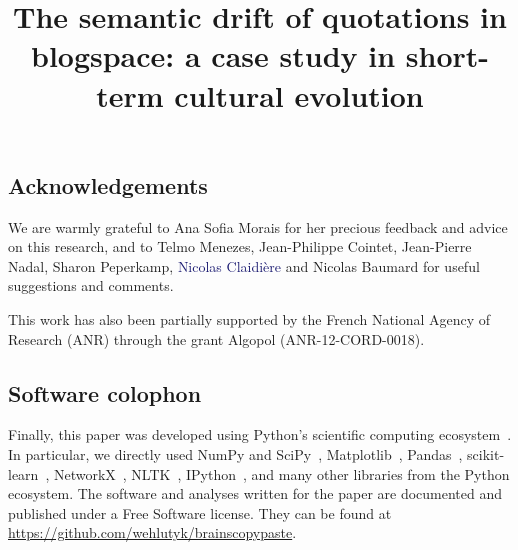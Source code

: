 \documentclass[man]{apa6}
\title{The semantic drift of quotations in blogspace: a case study in short-term cultural evolution}
\date{}
\newcommand{\tg}[1]{\textcolor{MidnightBlue}{#1}}
\newcommand{\newtext}[1]{\tg{#1}}
\newenvironment{new}{\par\color{MidnightBlue}}{\par}
\begin{document}
\maketitle







\subsection*{Acknowledgements}

We are warmly grateful to Ana Sofia Morais for her precious feedback and advice on this research, and to Telmo Menezes, Jean-Philippe Cointet, Jean-Pierre Nadal, Sharon Peperkamp, \newtext{Nicolas Claidière} and Nicolas Baumard for useful suggestions and comments.

{\new This work has also been partially supported by the French National Agency of Research (ANR) through the grant Algopol (ANR-12-CORD-0018).}

\begin{new}

\subsection*{Software colophon}

Finally, this paper was developed using Python's scientific computing ecosystem~\citep{millman_python_2011}.
In particular, we directly used NumPy and SciPy~\citep{walt_numpy_2011}, Matplotlib~\citep{hunter_matplotlib:_2007}, Pandas~\citep{mckinney_data_2010}, scikit-learn~\citep{pedregosa_scikit-learn:_2011}, NetworkX~\citep{hagberg_exploring_2008}, NLTK~\citep{bird_nltk_2009}, IPython~\citep{perez_ipython:_2007}, and many other libraries from the Python ecosystem.
The software and analyses written for the paper are documented and published under a Free Software license.
They can be found at \url{https://github.com/wehlutyk/brainscopypaste}.

\end{new}



\end{document}
